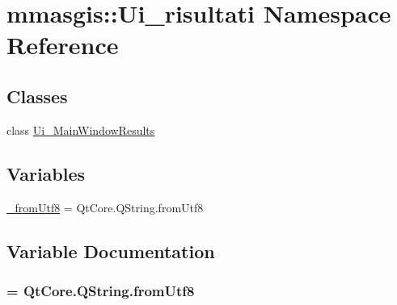 \hypertarget{namespacemmasgis_1_1Ui__risultati}{
\section{mmasgis::Ui\_\-risultati Namespace Reference}
\label{namespacemmasgis_1_1Ui__risultati}
}
\subsection*{Classes}
\begin{DoxyCompactItemize}
\item 
class \hyperlink{classmmasgis_1_1Ui__risultati_1_1Ui__MainWindowResults}{Ui\_\-MainWindowResults}
\end{DoxyCompactItemize}
\subsection*{Variables}
\begin{DoxyCompactItemize}
\item 
\hyperlink{namespacemmasgis_1_1Ui__risultati_a0c61c672e17e78542f16a6dc31776329}{\_\-fromUtf8} = QtCore.QString.fromUtf8
\end{DoxyCompactItemize}


\subsection{Variable Documentation}
\hypertarget{namespacemmasgis_1_1Ui__risultati_a0c61c672e17e78542f16a6dc31776329}{
\subsubsection[{\_\-fromUtf8}]{ = QtCore.QString.fromUtf8}}
\label{namespacemmasgis_1_1Ui__risultati_a0c61c672e17e78542f16a6dc31776329}
